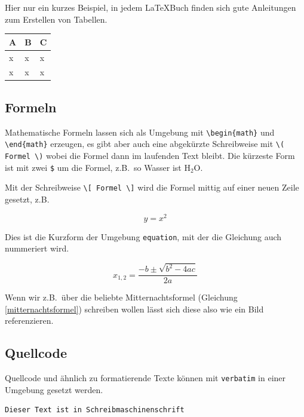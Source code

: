 Hier nur ein kurzes Beispiel, in jedem \LaTeX Buch finden sich gute Anleitungen zum Erstellen von Tabellen.

\begin{table}[h]
\begin{center}
\begin{tabular}{|l|l|l|}
	A & B & C \\\hline
	x & x & x \\
	x & x & x
\end{tabular}
\end{center}
\end{table}


\subsection{Formeln}

Mathematische Formeln lassen sich als Umgebung mit \verb|\begin{math}| und \verb|\end{math}| erzeugen, es gibt aber auch eine abgekürzte Schreibweise mit \verb|\( Formel \)| wobei die Formel dann im laufenden Text bleibt. Die kürzeste Form ist mit zwei \verb|$| um die Formel, z.B.~so Wasser ist H$_2$O.

Mit der Schreibweise \verb|\[ Formel \]| wird die Formel mittig auf einer neuen Zeile gesetzt, z.B.

\[y = x^2 \]

Dies ist die Kurzform der Umgebung \verb|equation|, mit der die Gleichung auch nummeriert wird. 

\begin{equation}
x_{1,2} = \frac{-b\pm\sqrt{b^2-4ac}}{2a}
\label{mitternachtsformel}
\end{equation}

Wenn wir z.B.~über die beliebte Mitternachtsformel (Gleichung \ref{mitternachtsformel}) schreiben wollen lässt sich diese also wie ein Bild referenzieren.



\subsection{Quellcode}

Quellcode und ähnlich zu formatierende Texte können mit \verb|verbatim| in einer Umgebung gesetzt werden.

\begin{verbatim}
Dieser Text ist in Schreibmaschinenschrift
\end{verbatim}

